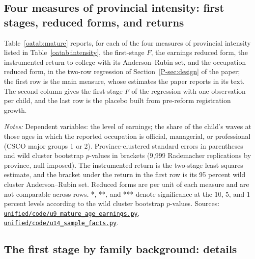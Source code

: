 \documentclass[11pt]{article}
\numberwithin{equation}{section}
\newcommand{\repourl}{https://github.com/JiachenJin1001/before-the-labor-market-or-inside-it}
\newcommand{\code}[1]{\href{\repourl/blob/main/#1}{\nolinkurl{#1}}}
\begin{document}
\subsection{Four measures of provincial intensity: first stages, reduced forms, and returns}
\label{oa:mature}

Table~\ref{oatab:mature} reports, for each of the four measures of provincial intensity listed in Table~\ref{oatab:intensity}, the first-stage $F$, the earnings reduced form, the instrumented return to college with its Anderson--Rubin set, and the occupation reduced form, in the two-row regression of Section~\ref{P-sec:design} of the paper; the first row is the main measure, whose estimates the paper reports in its text. The second column gives the first-stage $F$ of the regression with one observation per child, and the last row is the placebo built from pre-reform registration growth.

\begin{table}[tbp]
\centering
\small
\caption{Earnings and occupation at ages 30 and over: first stages, reduced forms, and instrumented returns across measures of provincial intensity.}
\label{oatab:mature}
\setlength{\tabcolsep}{4pt}
\resizebox{\ifdim\width>\textwidth\textwidth\else\width\fi}{!}{}
\par\smallskip
\begin{minipage}{0.96\textwidth}
\footnotesize\emph{Notes:}  Dependent variables: the level of earnings; the share of the child's waves at those ages in which the reported occupation is official, managerial, or professional (CSCO major groups 1 or 2). Province-clustered standard errors in parentheses and wild cluster bootstrap $p$-values in brackets (9,999 Rademacher replications by province, null imposed). The instrumented return is the two-stage least squares estimate, and the bracket under the return in the first row is its 95 percent wild cluster Anderson--Rubin set. Reduced forms are per unit of each measure and are not comparable across rows. *, **, and *** denote significance at the 10, 5, and 1 percent levels according to the wild cluster bootstrap $p$-values. Sources: \code{unified/code/u9_mature_age_earnings.py}, \code{unified/code/u14_sample_facts.py}.
\end{minipage}
\end{table}

\subsection{The first stage by family background: details}
\end{document}
